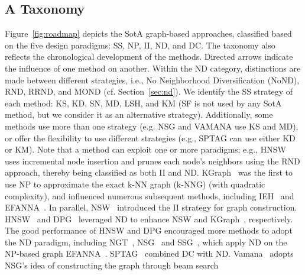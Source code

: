 \subsection{A Taxonomy}
Figure~\ref{fig:roadmap} depicts the SotA graph-based approaches, classified based on the five design paradigms: SS, NP, II, ND, and DC.
The taxonomy also reflects the chronological development of the methods. 
Directed arrows %
indicate the influence of one method on another. Within the ND category, distinctions are made between different strategies, i.e., No Neighborhood Diversification (NoND), RND, RRND, and MOND (cf. Section~\ref{sec:nd}). 
We identify the SS strategy of each method: KS, KD, SN, MD, LSH, and KM (SF is not used by any SotA method, but we consider it as an alternative strategy). 
Additionally, some methods use more than one strategy (e.g. NSG and VAMANA use KS and MD), or offer the flexibility to use different strategies (e.g., SPTAG can use either KD or KM). 
Note that a method can exploit one or more paradigms; e.g., HNSW uses incremental node insertion and prunes each node's neighbors using the RND approach, thereby being classified as both II and ND. %
KGraph~\cite{kgraph} was the first to use NP to approximate the exact k-NN graph (k-NNG) (with quadratic complexity), and influenced numerous subsequent methods, including IEH~\cite{ieh} and EFANNA~\cite{efanna}. In parallel, NSW~\cite{nsw11} introduced the II strategy for graph construction.
HNSW~\cite{hnsw} and DPG~\cite{dpg} leveraged ND to enhance NSW and KGraph~\cite{kgraph}, respectively.
The good performance of HNSW and DPG encouraged more methods to adopt the ND paradigm, including NGT~\cite{ngt_library}, NSG~\cite{nsg} and SSG~\cite{nssg}, which apply ND on the NP-based graph EFANNA~\cite{efanna}. SPTAG~\cite{SPTAG4} combined DC with ND. 
Vamana~\cite{vamana} adopts NSG's idea of constructing the graph through beam search 
